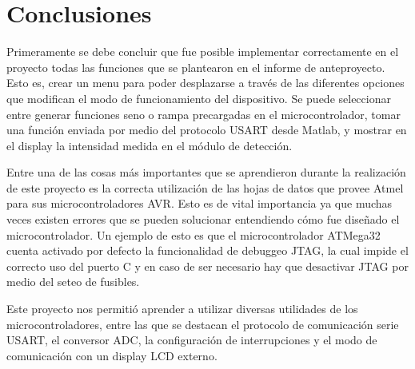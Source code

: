 \section{Conclusiones}
\label{sec:conclusiones}

Primeramente se debe concluir que fue posible implementar correctamente en el proyecto todas las funciones que se plantearon en el informe de anteproyecto. Esto es, crear un menu para poder desplazarse a través de las diferentes opciones que modifican el modo de funcionamiento del dispositivo. Se puede seleccionar entre generar funciones seno o rampa precargadas en el microcontrolador, tomar una función enviada por medio del protocolo USART desde Matlab, y mostrar en el display la intensidad medida en el módulo de detección.

Entre una de las cosas más importantes que se aprendieron durante la realización de este proyecto es la correcta utilización de las hojas de datos que provee Atmel para sus microcontroladores AVR. Esto es de vital importancia ya que muchas veces existen errores que se pueden solucionar entendiendo cómo fue diseñado el microcontrolador. Un ejemplo de esto es que el microcontrolador ATMega32 cuenta activado por defecto la funcionalidad de debuggeo JTAG, la cual impide el correcto uso del puerto C y en caso de ser necesario hay que desactivar JTAG por medio del seteo de fusibles.

Este proyecto nos permitió aprender a utilizar diversas utilidades de los microcontroladores, entre las que se destacan el protocolo de comunicación serie USART, el conversor ADC, la configuración de interrupciones y el modo de comunicación con un display LCD externo.